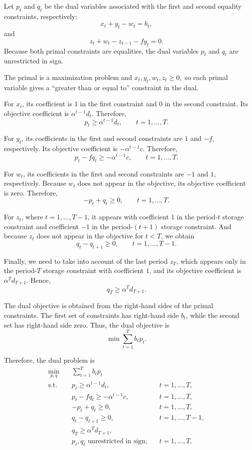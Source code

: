 \documentclass{article}
\begin{document}
Let $p_t$ and $q_t$ be the dual variables associated with the first and
second equality constraints, respectively:
\[
x_t+y_t-w_t=b_t,
\]
and
\[
z_t+w_t-z_{t-1}-fy_t=0.
\]
Because both primal constraints are equalities, the dual variables
$p_t$ and $q_t$ are unrestricted in sign.

The primal is a maximization problem and
$
x_t,y_t,w_t,z_t\geq 0,
$
so each primal variable gives a ``greater than or equal to'' constraint
in the dual.

For $x_t$, its coefficient is $1$ in the first constraint and $0$ in
the second constraint. Its objective coefficient is
$\alpha^{t-1}d_t$. Therefore,
\[
p_t\geq \alpha^{t-1}d_t,
\qquad t=1,\ldots,T.
\]

For $y_t$, its coefficients in the first and second constraints are
$1$ and $-f$, respectively. Its objective coefficient is
$-\alpha^{t-1}c$. Therefore,
\[
p_t-fq_t\geq -\alpha^{t-1}c,
\qquad t=1,\ldots,T.
\]

For $w_t$, its coefficients in the first and second constraints are
$-1$ and $1$, respectively. Because $w_t$ does not appear in the
objective, its objective coefficient is zero. Therefore,
\[
-p_t+q_t\geq 0,
\qquad t=1,\ldots,T.
\]

For $z_t$, where $t=1,\ldots,T-1$, it appears with coefficient $1$ in
the period-$t$ storage constraint and coefficient $-1$ in the
period-$(t+1)$ storage constraint. And because $z_t$ does not appear in the
objective for $t<T$, we obtain
\[
q_t-q_{t+1}\geq 0,
\qquad t=1,\ldots,T-1.
\]

Finally, we need to take into account of the last period $z_T$, which appears only in the period-$T$ storage constraint with
coefficient $1$, and its objective coefficient is
$\alpha^T d_{T+1}$. Hence,
\[
q_T\geq \alpha^T d_{T+1}.
\]

The dual objective is obtained from the right-hand sides of the primal
constraints. The first set of constraints has right-hand side $b_t$,
while the second set has right-hand side zero. Thus, the dual objective
is
\[
\min \sum_{t=1}^T b_t p_t.
\]

Therefore, the dual problem is
\[
\begin{aligned}
\min_{p,q}\quad
& \sum_{t=1}^T b_t p_t\\
\text{s.t.}\quad
& p_t\geq \alpha^{t-1}d_t,
&& t=1,\ldots,T,\\
& p_t-fq_t\geq -\alpha^{t-1}c,
&& t=1,\ldots,T,\\
& -p_t+q_t\geq 0,
&& t=1,\ldots,T,\\
& q_t-q_{t+1}\geq 0,
&& t=1,\ldots,T-1,\\
& q_T\geq \alpha^T d_{T+1},\\
& p_t,q_t\text{ unrestricted in sign},
&& t=1,\ldots,T.
\end{aligned}
\]
\end{document}
